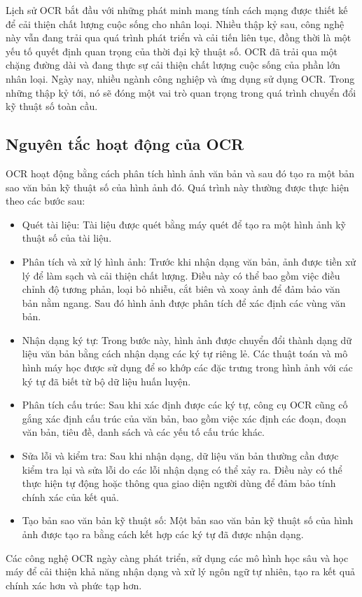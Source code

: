 Lịch sử OCR bắt đầu với những phát minh mang tính cách mạng được thiết kế để cải thiện chất lượng cuộc sống cho nhân loại. Nhiều thập kỷ sau, công nghệ này vẫn đang trải qua quá trình phát triển và cải tiến liên tục, đồng thời là một yếu tố quyết định quan trọng của thời đại kỹ thuật số. OCR đã trải qua một chặng đường dài và đang thực sự cải thiện chất lượng cuộc sống của phần lớn nhân loại. Ngày nay, nhiều ngành công nghiệp và ứng dụng sử dụng OCR. Trong những thập kỷ tới, nó sẽ đóng một vai trò quan trọng trong quá trình chuyển đổi kỹ thuật số toàn cầu.\cite{veryfi}

\subsection{Nguyên tắc hoạt động của OCR}
OCR hoạt động bằng cách phân tích hình ảnh văn bản và sau đó tạo ra một bản sao văn bản kỹ thuật số của hình ảnh đó. Quá trình này thường được thực hiện theo các bước sau:
\begin{itemize}
    \item Quét tài liệu: Tài liệu được quét bằng máy quét để tạo ra một hình ảnh kỹ thuật số của tài liệu.
    \item Phân tích và xử lý hình ảnh: Trước khi nhận dạng văn bản, ảnh được tiền xử lý để làm sạch và cải thiện chất lượng. Điều này có thể bao gồm việc điều chỉnh độ tương phản, loại bỏ nhiễu, cắt biên và xoay ảnh để đảm bảo văn bản nằm ngang. Sau đó hình ảnh được phân tích để xác định các vùng văn bản.
    \item Nhận dạng ký tự: Trong bước này, hình ảnh được chuyển đổi thành dạng dữ liệu văn bản bằng cách nhận dạng các ký tự riêng lẻ. Các thuật toán và mô hình máy học được sử dụng để so khớp các đặc trưng trong hình ảnh với các ký tự đã biết từ bộ dữ liệu huấn luyện.
    \item Phân tích cấu trúc: Sau khi xác định được các ký tự, công cụ OCR cũng cố gắng xác định cấu trúc của văn bản, bao gồm việc xác định các đoạn, đoạn văn bản, tiêu đề, danh sách và các yếu tố cấu trúc khác.
    \item Sửa lỗi và kiểm tra: Sau khi nhận dạng, dữ liệu văn bản thường cần được kiểm tra lại và sửa lỗi do các lỗi nhận dạng có thể xảy ra. Điều này có thể thực hiện tự động hoặc thông qua giao diện người dùng để đảm bảo tính chính xác của kết quả.
    \item Tạo bản sao văn bản kỹ thuật số: Một bản sao văn bản kỹ thuật số của hình ảnh được tạo ra bằng cách kết hợp các ký tự đã được nhận dạng.
\end{itemize}
Các công nghệ OCR ngày càng phát triển, sử dụng các mô hình học sâu và học máy để cải thiện khả năng nhận dạng và xử lý ngôn ngữ tự nhiên, tạo ra kết quả chính xác hơn và phức tạp hơn.

